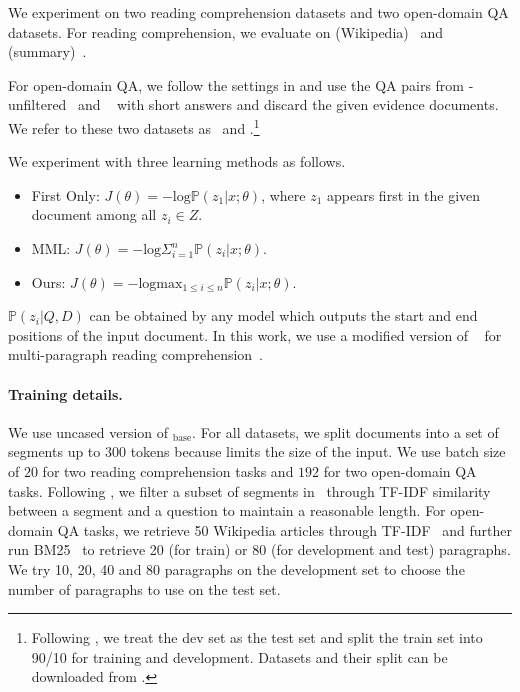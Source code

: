 \documentclass[11pt,a4paper]{article}
\begin{document}
We experiment on two reading comprehension datasets and two open-domain QA datasets. For reading comprehension, we evaluate on \trivia{} (Wikipedia)~\citep{triviaqa} and \narrative{} (summary)~\citep{narrativeqa}. 


For open-domain QA, we follow the settings in \citet{lee2019latent} and use the QA pairs from \trivia-unfiltered~\citep{triviaqa} and \nq~\citep{naturalquestions} with short answers and discard the given evidence documents. We refer to these two datasets as \triviaopen\ and \nqopen.\footnote{
Following \citet{lee2019latent}, we treat the dev set as the test set and split the train set into 90/10 for training and development.
Datasets and their split can be downloaded from \dataurl.}


We experiment with three learning methods as follows.
\vspace{-2pt}
\begin{itemize}\itemsep -.7pt
    \item First Only: $J(\theta{}) = - \mathrm{log} \mathbb{P}(z_1|x;\theta{})$, where $z_1$ appears first in the given document among all $z_i \in Z$.
    \item MML: $J(\theta{}) = - \mathrm{log} \Sigma_{i=1}^{n}  \mathbb{P}(z_i|x;\theta{})$.
    \item Ours: $J(\theta{}) = - \mathrm{log} \mathrm{max}_{1 \leq i \leq n}  \mathbb{P}(z_i|x;\theta{})$.
\end{itemize}

$\mathbb{P}(z_i|Q, D)$ can be obtained by any model which outputs the start and end positions of the input document. In this work, we use a modified version of \bert{}~\citep{bert} for multi-paragraph reading comprehension~\citep{min2019compositional}.


\paragraph{Training details.} We use uncased version of \bert{}$_\text{base}$.
For all datasets, we split  documents into a set of segments up to 300 tokens because \bert{} limits the size of the input.
We use batch size of $20$ for two reading comprehension tasks and $192$ for two open-domain QA tasks.
Following \citet{clark2018multi}, we filter a subset of segments in \trivia\ through TF-IDF similarity between a segment and a question to maintain a reasonable length. 
For open-domain QA tasks, we retrieve 50 Wikipedia articles through TF-IDF~\citep{squad-open} and further run BM25~\citep{robertson2009probabilistic} to retrieve 20 (for train) or 80 (for development and test) paragraphs. We try 10, 20, 40 and 80 paragraphs on the development set to choose the number of paragraphs to use on the test set.
\end{document}
